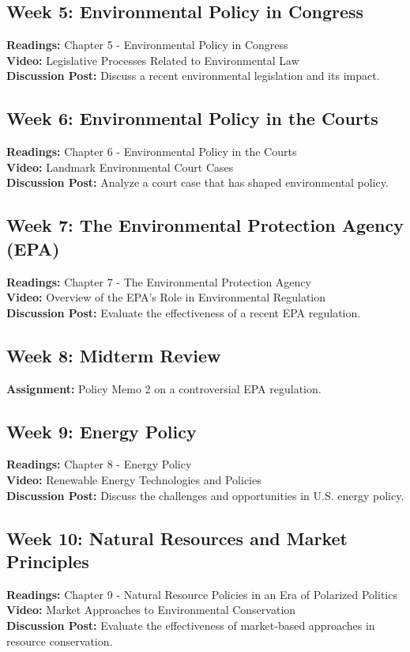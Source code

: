 \documentclass[12pt, letterpaper]{article}
\begin{document}
\subsection*{Week 5: Environmental Policy in Congress}
\textbf{Readings:} Chapter 5 - Environmental Policy in Congress\\
\textbf{Video:} Legislative Processes Related to Environmental Law\\
\textbf{Discussion Post:} Discuss a recent environmental legislation and its impact.

\subsection*{Week 6: Environmental Policy in the Courts}
\textbf{Readings:} Chapter 6 - Environmental Policy in the Courts\\
\textbf{Video:} Landmark Environmental Court Cases\\
\textbf{Discussion Post:} Analyze a court case that has shaped environmental policy.

\subsection*{Week 7: The Environmental Protection Agency (EPA)}
\textbf{Readings:} Chapter 7 - The Environmental Protection Agency\\
\textbf{Video:} Overview of the EPA's Role in Environmental Regulation\\
\textbf{Discussion Post:} Evaluate the effectiveness of a recent EPA regulation.

\subsection*{Week 8: Midterm Review}
\textbf{Assignment:} Policy Memo 2 on a controversial EPA regulation.

\subsection*{Week 9: Energy Policy}
\textbf{Readings:} Chapter 8 - Energy Policy\\
\textbf{Video:} Renewable Energy Technologies and Policies\\
\textbf{Discussion Post:} Discuss the challenges and opportunities in U.S. energy policy.

\subsection*{Week 10: Natural Resources and Market Principles}
\textbf{Readings:} Chapter 9 - Natural Resource Policies in an Era of Polarized Politics\\
\textbf{Video:} Market Approaches to Environmental Conservation\\
\textbf{Discussion Post:} Evaluate the effectiveness of market-based approaches in resource conservation.
\end{document}

